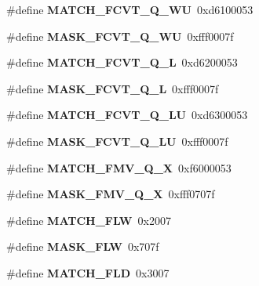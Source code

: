 \begin{DoxyCompactItemize}
\#define {\bfseries M\+A\+T\+C\+H\+\_\+\+F\+C\+V\+T\+\_\+\+Q\+\_\+\+WU}~0xd6100053
\item 
\mbox{\label{riscv-utility_8h_a73c8609db2b0e47aa445070270405900}} 
\#define {\bfseries M\+A\+S\+K\+\_\+\+F\+C\+V\+T\+\_\+\+Q\+\_\+\+WU}~0xfff0007f
\item 
\mbox{\label{riscv-utility_8h_a97b09cfd86f7a2ecfc04d7356eba48ba}} 
\#define {\bfseries M\+A\+T\+C\+H\+\_\+\+F\+C\+V\+T\+\_\+\+Q\+\_\+L}~0xd6200053
\item 
\mbox{\label{riscv-utility_8h_ac5a1b9b3caaa7c0956e36498d4b00f57}} 
\#define {\bfseries M\+A\+S\+K\+\_\+\+F\+C\+V\+T\+\_\+\+Q\+\_\+L}~0xfff0007f
\item 
\mbox{\label{riscv-utility_8h_a091bdacb874d855d853d1a8e036048f9}} 
\#define {\bfseries M\+A\+T\+C\+H\+\_\+\+F\+C\+V\+T\+\_\+\+Q\+\_\+\+LU}~0xd6300053
\item 
\mbox{\label{riscv-utility_8h_aacd20352785ee61998b5505c5587d715}} 
\#define {\bfseries M\+A\+S\+K\+\_\+\+F\+C\+V\+T\+\_\+\+Q\+\_\+\+LU}~0xfff0007f
\item 
\mbox{\label{riscv-utility_8h_af70470a46145a539c5aba80d2c70b022}} 
\#define {\bfseries M\+A\+T\+C\+H\+\_\+\+F\+M\+V\+\_\+\+Q\+\_\+X}~0xf6000053
\item 
\mbox{\label{riscv-utility_8h_ab5b2588ba868616a90740c5130896f9c}} 
\#define {\bfseries M\+A\+S\+K\+\_\+\+F\+M\+V\+\_\+\+Q\+\_\+X}~0xfff0707f
\item 
\mbox{\label{riscv-utility_8h_a5c25e59913249f81f730816eb10c5056}} 
\#define {\bfseries M\+A\+T\+C\+H\+\_\+\+F\+LW}~0x2007
\item 
\mbox{\label{riscv-utility_8h_acc24f82cbed48b8f787f7f43a425f989}} 
\#define {\bfseries M\+A\+S\+K\+\_\+\+F\+LW}~0x707f
\item 
\mbox{\label{riscv-utility_8h_aab0a05c11af0c233578e9f65726fb075}} 
\#define {\bfseries M\+A\+T\+C\+H\+\_\+\+F\+LD}~0x3007
\item 

\end{DoxyCompactItemize}

